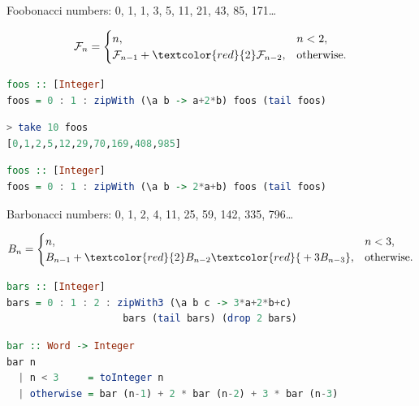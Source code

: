 \documentclass[handout]{beamer}
\begin{document}
\begin{frame}[fragile]{Foobonacci numbers: 0, 1, 1, 3, 5, 11, 21, 43, 85, 171\dots}

$$
\mathcal{F}_n = \begin{cases}
n, & n < 2, \\
\mathcal{F}_{n-1} + \textcolor{red}{2}\mathcal{F}_{n-2}, & \text{otherwise}.
\end{cases}
$$

\begin{lstlisting}[language=Haskell]
foos :: [Integer]
foos = 0 : 1 : zipWith (\a b -> a+2*b) foos (tail foos)
\end{lstlisting}

\begin{lstlisting}[language=Haskell]
> take 10 foos
[0,1,2,5,12,29,70,169,408,985]
\end{lstlisting}

\begin{lstlisting}[language=Haskell]
foos :: [Integer]
foos = 0 : 1 : zipWith (\a b -> 2*a+b) foos (tail foos)
\end{lstlisting}

\end{frame}

\begin{frame}[fragile]{Barbonacci numbers: 0, 1, 2, 4, 11, 25, 59, 142, 335, 796\dots}

$$
B_n = \begin{cases}
n, & n < 3, \\
B_{n-1} + \textcolor{red}{2}B_{n-2} \textcolor{red}{{}+ 3B_{n-3}}, & \text{otherwise}.
\end{cases}
$$

\begin{lstlisting}[language=Haskell]
bars :: [Integer]
bars = 0 : 1 : 2 : zipWith3 (\a b c -> 3*a+2*b+c)
                    bars (tail bars) (drop 2 bars)
\end{lstlisting}

\begin{lstlisting}[language=Haskell]
bar :: Word -> Integer
bar n
  | n < 3     = toInteger n
  | otherwise = bar (n-1) + 2 * bar (n-2) + 3 * bar (n-3)
\end{lstlisting}

\end{frame}
\end{document}
